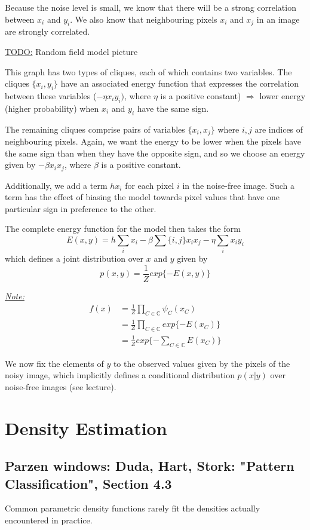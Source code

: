 \documentclass{scrartcl}
\begin{document}
\begin{appendices}
Because the noise level is small, we know that there will be a strong correlation between \(x_i\) and \(y_i\). We also know that neighbouring pixels \(x_i\) and \(x_j\) in an image are strongly correlated.

\underline{TODO:} Random field model picture

This graph has two types of cliques, each of which contains two variables. The cliques \(\{x_i, y_i\}\) have an associated energy function that expresses the correlation between these variables (\(-\eta x_i y_i)\), where \(\eta\) is a positive constant) \(\Rightarrow\) lower energy (higher probability) when \(x_i\) and \(y_i\) have the same sign.

The remaining cliques comprise pairs of variables \(\{x_i, x_j\}\) where \(i, j\) are indices of neighbouring pixels. Again, we want the energy to be lower when the pixels have the same sign than when they have the opposite sign, and so we choose an energy given by \(-\beta x_i x_j\), where \(\beta\) is a positive constant.

Additionally, we add a term \(hx_i\) for each pixel \(i\) in the noise-free image. Such a term has the effect of biasing the model towards pixel values that have one particular sign in preference to the other.

The complete energy function for the model then takes the form
\[E(x,y) = h \sum_i x_i - \beta \sum{\{i,j\}} x_ix_j - \eta \sum_i x_i y_i\]
which defines a joint distribution over \(x\) and \(y\) given by
\[p(x,y) = \frac{1}{Z} exp\{-E(x,y)\}\]

\underline{\textit{Note:}}
\begin{align*}
    f(x) &= \frac{1}{Z} \prod_{C \in \mathbb{C}} \psi_C(x_C)\\
    &= \frac{1}{Z} \prod_{C \in \mathbb{C}} exp\{-E(x_C)\}\\
    &= \frac{1}{Z} exp\{-\sum_{C \in \mathbb{C}}E(x_C)\}
\end{align*}

We now fix the elements of \(y\) to the observed values given by the pixels of the noisy image, which implicitly defines a conditional distribution \(p(x|y)\) over noise-free images (see lecture).

\section{Density Estimation}
\subsection{Parzen windows:	Duda, Hart, Stork: "Pattern Classification", Section 4.3}
Common parametric density functions rarely fit the densities actually encountered in practice.


\end{appendices}
\end{document}
